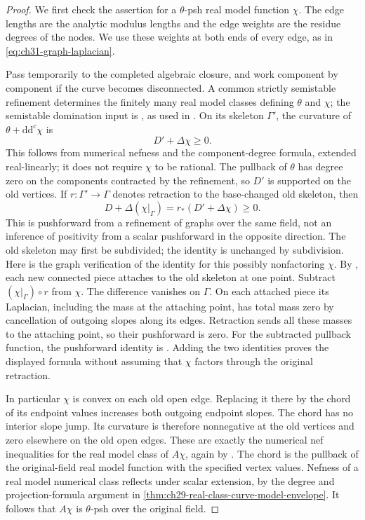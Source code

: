 \begin{proof}
We first check the assertion for a \(\theta\)-psh real model
function \(\chi\).  The edge lengths are the analytic modulus
lengths and the edge weights are the residue degrees of the nodes.
We use these weights at both ends of every edge, as in
\eqref{eq:ch31-graph-laplacian}.

Pass temporarily to the completed algebraic closure, and work
component by component if the curve becomes disconnected.  A common
strictly semistable refinement determines the finitely many real
model classes defining \(\theta\) and \(\chi\); the semistable
domination input is \cite[\S7]{BL85}, as used in
\cite[proof of Proposition~3.7]{GJKM19}.  On its skeleton \(\Gamma'\),
the curvature of \(\theta+\mathrm d\mathrm d^c\chi\) is
\[
                      D'+\Delta\chi\geq0.
\]
This follows from numerical nefness and the component-degree formula,
extended real-linearly; it does not require \(\chi\) to be rational.
The pullback of \(\theta\) has degree zero on the components
contracted by the refinement, so \(D'\) is supported on the old
vertices.  If \(r:\Gamma'\to\Gamma\) denotes retraction to the
base-changed old skeleton, then
\[
      D+\Delta(\chi|_\Gamma)
          =r_*(D'+\Delta\chi)\geq0.
\]
This is pushforward from a refinement of graphs over the same field,
not an inference of positivity from a scalar pushforward in the
opposite direction.  The old skeleton may first be subdivided;
the identity is unchanged by subdivision.
Here is the graph verification of the identity for this possibly
nonfactoring \(\chi\).  By \cite[Proposition~2.2.26(iii)]{Thu05},
each new connected piece attaches to the old skeleton at one point.
Subtract \((\chi|_\Gamma)\circ r\) from \(\chi\).  The difference
vanishes on \(\Gamma\).  On each attached piece its Laplacian,
including the mass at the attaching point, has total mass zero by
cancellation of outgoing slopes along its edges.  Retraction sends
all these masses to the attaching point, so their pushforward is zero.
For the subtracted pullback function, the pushforward identity is
\cite[Proposition~2.2.26(iv)]{Thu05}.  Adding the two identities proves
the displayed formula without assuming that \(\chi\) factors
through the original retraction.

In particular \(\chi\) is convex on each old open edge.  Replacing
it there by the chord of its endpoint values increases both outgoing
endpoint slopes.  The chord has no interior slope jump.  Its
curvature is therefore nonnegative at the old vertices and zero
elsewhere on the old open edges.  These are exactly the numerical
nef inequalities for the real model class of \(A\chi\), again by
\cite[Proposition~3.7]{GJKM19}.  The chord is the pullback of the
original-field real model function with the specified vertex values.
Nefness of a real model numerical class reflects under scalar
extension, by the degree and projection-formula argument in
\cref{thm:ch29-real-class-curve-model-envelope}.  It follows that
\(A\chi\) is \(\theta\)-psh over the original field.


\end{proof}
